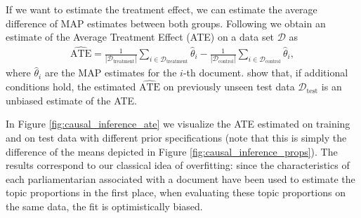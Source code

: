 If we want to estimate the treatment effect, we can estimate the average difference of MAP estimates between both groups. Following \cite{egami2018make} we obtain an estimate of the Average Treatment Effect (ATE) on a data set $\mathcal{D}$ as 
\begin{align}
\widehat{\text{ATE}} = \frac{1}{|\mathcal{D}_{\text{treatment}}|}\sum_{i \in \mathcal{D}_{\text{treatment}}} \hat{\theta}_i - \frac{1}{|\mathcal{D}_{\text{control}}|}\sum_{i \in \mathcal{D}_{\text{control}}} \hat{\theta}_i,
\end{align} 
where $\hat{\theta}_i$ are the MAP estimates for the $i$-th document. \cite{egami2018make} show that, if additional conditions hold, the estimated $\widehat{\text{ATE}}$ on previously unseen test data $\mathcal{D}_{\text{test}}$ is an unbiased estimate of the ATE.

In Figure \ref{fig:causal_inference_ate} we visualize the ATE estimated on training and on test data with different prior specifications (note that this is simply the difference of the means depicted in Figure \ref{fig:causal_inference_props}). The results correspond to our classical idea of overfitting: since the characteristics of each parliamentarian associated with a document have been used to estimate the topic proportions in the first place, when evaluating these topic proportions on the same data, the fit is optimistically biased. 

